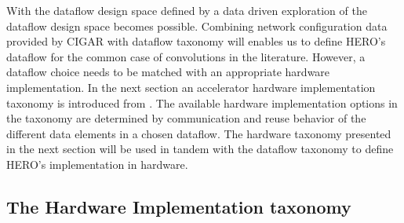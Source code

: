 With the dataflow design space defined by \cite{dnn_df_overrated} a data driven
exploration of the dataflow design space becomes possible. Combining network
configuration data provided by CIGAR with  \cite{dnn_df_overrated} dataflow
taxonomy will enables us to define HERO's dataflow for the common case of
convolutions in the literature. However, a dataflow choice needs to be matched
with an appropriate hardware implementation. In the next section an accelerator
hardware implementation taxonomy is introduced from \cite{maestro}. The
available hardware implementation options in the taxonomy are determined by
communication and reuse behavior of the different data elements in a chosen
dataflow. The hardware taxonomy presented in the next section will be used in
tandem with the dataflow taxonomy to define HERO's implementation in hardware.  

\subsection{The Hardware Implementation taxonomy}

